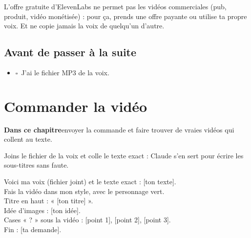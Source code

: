 \documentclass[11pt,oneside,openany]{book}
\newcommand{\coche}{$\square$\ }
\newcommand{\objectif}[1]{\begin{tcolorbox}[enhanced,colback=encre,colframe=encre,arc=2pt,boxrule=0pt,left=9pt,right=9pt,top=6pt,bottom=6pt,fontupper=\small\color{white}]{\color{citron}\bfseries Dans ce chapitre}\quad #1\end{tcolorbox}}
\newenvironment{bilan}{\section*{Avant de passer à la suite}\begin{itemize}[label={}]}{\end{itemize}}
\begin{document}
\begin{attention}
L'offre gratuite d'ElevenLabs ne permet pas les vidéos commerciales (pub, produit, vidéo monétisée) : pour ça, prends une offre payante ou utilise ta propre voix. Et ne copie jamais la voix de quelqu'un d'autre.
\end{attention}

\enlargethispage{3\baselineskip}
\begin{bilan}
  \item \coche J'ai le fichier MP3 de la voix.
\end{bilan}

\chapter{Commander la vidéo}
\objectif{envoyer la commande et faire trouver de vraies vidéos qui collent au texte.}
Joins le fichier de la voix et colle le texte exact : Claude s'en sert pour écrire les sous-titres sans faute.

\begin{acopier}
Voici ma voix (fichier joint) et le texte exact : [ton texte].\\
Fais la vidéo dans mon style, avec le personnage vert.\\
Titre en haut : « [ton titre] ».\\
Idée d'images : [ton idée].\\
Cases « ? » sous la vidéo : [point 1], [point 2], [point 3].\\
Fin : [ta demande].
\end{acopier}
\end{document}
